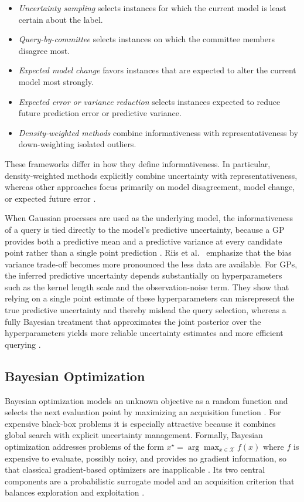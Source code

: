 \begin{itemize}
    \item \emph{Uncertainty sampling} selects instances for which the
    current model is least certain about the label.

    \item \emph{Query-by-committee} selects instances on which the
    committee members disagree most.

    \item \emph{Expected model change} favors instances that are expected
    to alter the current model most strongly.

    \item \emph{Expected error or variance reduction} selects instances
    expected to reduce future prediction error or predictive variance.

    \item \emph{Density-weighted methods} combine informativeness with
    representativeness by down-weighting isolated outliers.
\end{itemize}
These frameworks differ in how they define informativeness. In particular, density-weighted methods explicitly combine uncertainty with representativeness, whereas other approaches focus primarily on model disagreement, model change, or expected future error \cite{settles2009active}.

When Gaussian processes are used as the underlying model, the informativeness of a query is tied directly to the model's predictive uncertainty, because a GP provides both a predictive mean and a predictive variance at every candidate point rather than a single point prediction \cite{riis2022bayesian}. Riis et al.~\cite{riis2022bayesian} emphasize that the bias variance trade-off becomes more pronounced the less data are available. For GPs, the inferred predictive uncertainty depends substantially on hyperparameters such as the kernel length scale and the observation-noise term. They show that relying on a single point estimate of these hyperparameters can misrepresent the true predictive uncertainty and thereby mislead the query selection, whereas a fully Bayesian treatment that approximates the joint posterior over the hyperparameters yields more reliable uncertainty estimates and more efficient querying \cite{riis2022bayesian}.

\subsection{Bayesian Optimization}
Bayesian optimization models an unknown objective as a random function and selects the next evaluation point by maximizing an acquisition function \cite{snoek2012practical}. For expensive black-box problems it is especially attractive because it combines global search with explicit uncertainty management. Formally, Bayesian optimization addresses problems of the form $x^{\star} = \arg\max_{x \in \mathcal{X}} f(x)$ where $f$ is expensive to evaluate, possibly noisy, and provides no gradient information, so that classical gradient-based optimizers are inapplicable \cite{snoek2012practical}. Its two central components are a probabilistic surrogate model and an acquisition criterion that balances exploration and exploitation \cite{snoek2012practical}.

